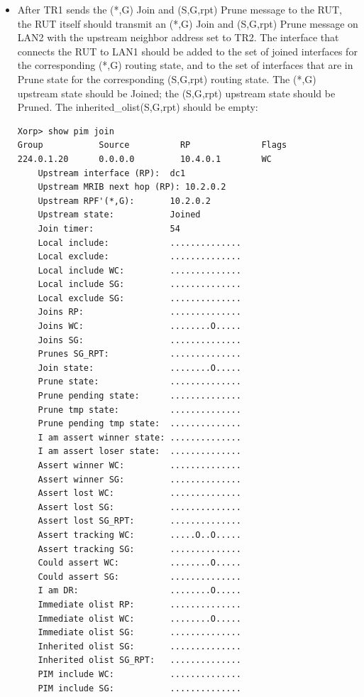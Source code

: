 \documentclass[11pt]{report}
\begin{document}
\begin{itemize}

  \item After TR1 sends the (*,G) Join and (S,G,rpt) Prune message to the RUT,
  the RUT itself should transmit an (*,G) Join and (S,G,rpt) Prune message on
  LAN2 with the upstream neighbor address set to TR2. The interface that
  connects the RUT to LAN1 should be added to the set of joined interfaces for
  the corresponding (*,G) routing state, and to the set of interfaces that are
  in Prune state for the corresponding (S,G,rpt) routing state. The (*,G)
  upstream state should be Joined; the (S,G,rpt) upstream state should be
  Pruned. The inherited\_olist(S,G,rpt) should be empty:

\begin{verbatim}
Xorp> show pim join 
Group           Source          RP              Flags
224.0.1.20      0.0.0.0         10.4.0.1        WC   
    Upstream interface (RP):  dc1
    Upstream MRIB next hop (RP): 10.2.0.2
    Upstream RPF'(*,G):       10.2.0.2
    Upstream state:           Joined 
    Join timer:               54
    Local include:            ..............
    Local exclude:            ..............
    Local include WC:         ..............
    Local include SG:         ..............
    Local exclude SG:         ..............
    Joins RP:                 ..............
    Joins WC:                 ........O.....
    Joins SG:                 ..............
    Prunes SG_RPT:            ..............
    Join state:               ........O.....
    Prune state:              ..............
    Prune pending state:      ..............
    Prune tmp state:          ..............
    Prune pending tmp state:  ..............
    I am assert winner state: ..............
    I am assert loser state:  ..............
    Assert winner WC:         ..............
    Assert winner SG:         ..............
    Assert lost WC:           ..............
    Assert lost SG:           ..............
    Assert lost SG_RPT:       ..............
    Assert tracking WC:       .....O..O.....
    Assert tracking SG:       ..............
    Could assert WC:          ........O.....
    Could assert SG:          ..............
    I am DR:                  ........O.....
    Immediate olist RP:       ..............
    Immediate olist WC:       ........O.....
    Immediate olist SG:       ..............
    Inherited olist SG:       ..............
    Inherited olist SG_RPT:   ..............
    PIM include WC:           ..............
    PIM include SG:           ..............

\end{verbatim}
\end{itemize}
\end{document}
